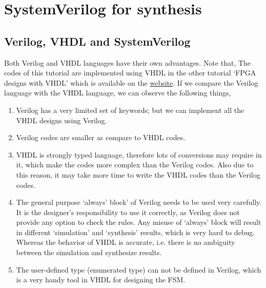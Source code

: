 \chapter{SystemVerilog for synthesis} \label{ch:SystemVerilogSyn}

\graphicspath{{Chapters/SystemVerilogIntro/Figures/}}



\section{Verilog, VHDL and SystemVerilog}
Both Verilog and VHDL languages have their own advantages. Note that, The codes of this tutorial are implemented using VHDL in the other tutorial `FPGA designs with VHDL' which is available on the \href{http://pythondsp.readthedocs.io/en/latest/pythondsp/toc.html}{website}. If we compare the Verilog language with the VHDL language, we can observe the following things, 

\begin{enumerate}
	\item Verilog has a very limited set of keywords; but we can implement all the VHDL designs using Verilog.   
	\item Verilog codes are smaller as compare to VHDL codes. 
	\item VHDL is strongly typed language, therefore lots of conversions may require in it, which make the codes more complex than the Verilog codes. Also due to this reason, it may take more time to write the VHDL codes than the Verilog codes.
	\item The general purpose `always' block' of Verilog needs to be used very carefully. It is the designer's responsibility to use it correctly, as Verilog does not provide any option to check the rules. Any misuse of `always' block will result in different `simulation' and `synthesis' results, which is very hard to debug. Whereas the behavior of VHDL is accurate, i.e. there is no ambiguity between the simulation and synthesize results. 
	\item The user-defined type (enumerated type) can not be defined in Verilog, which is a very handy tool in VHDL for designing the FSM. 
\end{enumerate}

